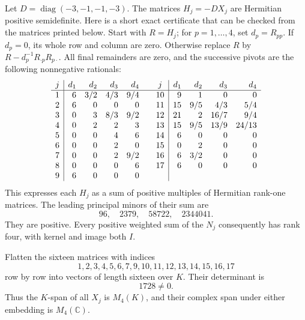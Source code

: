\documentclass[11pt]{article}
\theoremstyle{definition}
\theoremstyle{remark}
\begin{document}
Let $D=\operatorname{diag}(-3,-1,-1,-3)$.  The matrices $H_j=-DX_j$
are Hermitian positive semidefinite.  Here is a short exact certificate
that can be checked from the matrices printed below.  Start with
$R=H_j$; for $p=1,\ldots,4$, set $d_p=R_{pp}$.  If $d_p=0$, its
whole row and column are zero.  Otherwise replace
$R$ by $R-d_p^{-1}R_{\cdot p}R_{p\cdot}$.  All final remainders are
zero, and the successive pivots are the following nonnegative rationals:
\[
\begin{array}{c|rrrr@{\qquad}c|rrrr}
j&d_1&d_2&d_3&d_4&j&d_1&d_2&d_3&d_4\\\hline
1&6&3/2&4/3&9/4&10&9&1&0&0\\
2&6&0&0&0&11&15&9/5&4/3&5/4\\
3&0&3&8/3&9/2&12&21&2&16/7&9/4\\
4&0&2&2&3&13&15&9/5&13/9&24/13\\
5&0&0&4&6&14&6&0&0&0\\
6&0&0&2&0&15&0&2&0&0\\
7&0&0&2&9/2&16&6&3/2&0&0\\
8&0&0&0&6&17&6&0&0&0\\
9&6&0&0&0&&&&&
\end{array}
\]
This expresses each $H_j$ as a sum of positive multiples of Hermitian
rank-one matrices.  The leading principal minors of their sum are
\[
                         96,\quad2379,\quad58722,\quad2344041.
\]
They are positive.  Every positive weighted sum of the \(N_j\) consequently
has rank four, with kernel and image both \(I\).

Flatten the sixteen matrices with indices
\[
                    1,2,3,4,5,6,7,9,10,11,12,13,14,15,16,17
\]
row by row into vectors of length sixteen over \(K\).  Their determinant is
\[
                                  1728\ne0.
\]
Thus the \(K\)-span of all \(X_j\) is \(M_4(K)\), and their complex span
under either embedding is \(M_4(\mathbb C)\).
\end{document}
